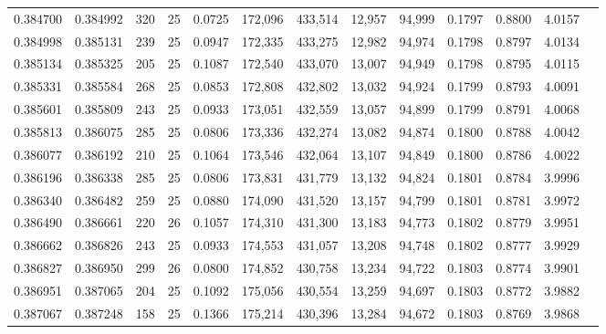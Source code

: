 \begin{tabular}{rrrrrrrrrrrrr}
0.384700 & 0.384992 & 320 &  25 &                                     0.0725 & 172,096 & 433,514 &  12,957 &  94,999 & 0.1797 & 0.8800 & 4.0157 \\
0.384998 & 0.385131 & 239 &  25 &                                     0.0947 & 172,335 & 433,275 &  12,982 &  94,974 & 0.1798 & 0.8797 & 4.0134 \\
0.385134 & 0.385325 & 205 &  25 &                                     0.1087 & 172,540 & 433,070 &  13,007 &  94,949 & 0.1798 & 0.8795 & 4.0115 \\
0.385331 & 0.385584 & 268 &  25 &                                     0.0853 & 172,808 & 432,802 &  13,032 &  94,924 & 0.1799 & 0.8793 & 4.0091 \\
0.385601 & 0.385809 & 243 &  25 &                                     0.0933 & 173,051 & 432,559 &  13,057 &  94,899 & 0.1799 & 0.8791 & 4.0068 \\
0.385813 & 0.386075 & 285 &  25 &                                     0.0806 & 173,336 & 432,274 &  13,082 &  94,874 & 0.1800 & 0.8788 & 4.0042 \\
0.386077 & 0.386192 & 210 &  25 &                                     0.1064 & 173,546 & 432,064 &  13,107 &  94,849 & 0.1800 & 0.8786 & 4.0022 \\
0.386196 & 0.386338 & 285 &  25 &                                     0.0806 & 173,831 & 431,779 &  13,132 &  94,824 & 0.1801 & 0.8784 & 3.9996 \\
0.386340 & 0.386482 & 259 &  25 &                                     0.0880 & 174,090 & 431,520 &  13,157 &  94,799 & 0.1801 & 0.8781 & 3.9972 \\
0.386490 & 0.386661 & 220 &  26 &                                     0.1057 & 174,310 & 431,300 &  13,183 &  94,773 & 0.1802 & 0.8779 & 3.9951 \\
0.386662 & 0.386826 & 243 &  25 &                                     0.0933 & 174,553 & 431,057 &  13,208 &  94,748 & 0.1802 & 0.8777 & 3.9929 \\
0.386827 & 0.386950 & 299 &  26 &                                     0.0800 & 174,852 & 430,758 &  13,234 &  94,722 & 0.1803 & 0.8774 & 3.9901 \\
0.386951 & 0.387065 & 204 &  25 &                                     0.1092 & 175,056 & 430,554 &  13,259 &  94,697 & 0.1803 & 0.8772 & 3.9882 \\
0.387067 & 0.387248 & 158 &  25 &                                     0.1366 & 175,214 & 430,396 &  13,284 &  94,672 & 0.1803 & 0.8769 & 3.9868 \\

\end{tabular}
